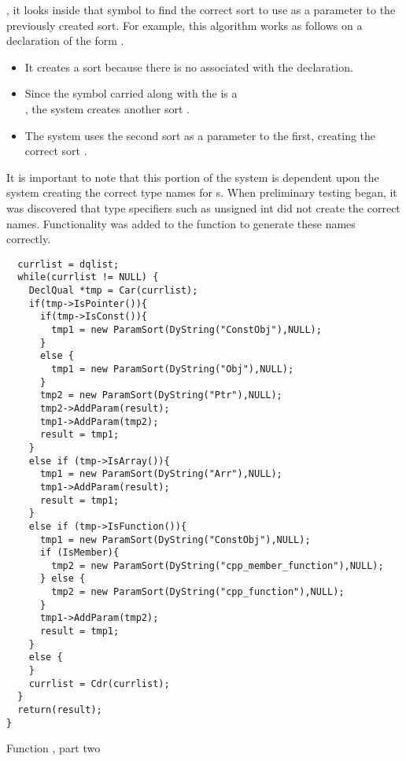 , it looks inside that symbol to find the correct
sort to use as a parameter to the previously created sort. For
example, this algorithm works as follows on a declaration of the form
.
\begin{itemize}
\item It creates a sort  because there is no
 associated with the declaration.
\item Since the symbol carried along with the 
is a \\
, the system creates another sort
.
\item The system uses the second sort as a parameter to the first,
creating the correct sort .
\end{itemize}

It is important to note that this portion of the system is dependent
upon the system creating the correct type names for
 s. When preliminary testing began, it
was discovered that type specifiers such as {unsigned int} did not
create the correct names. Functionality was added to the function
 to generate these names correctly. 

\begin{BFIGURE}
\small
\begin{verbatim}
  currlist = dqlist;
  while(currlist != NULL) {
    DeclQual *tmp = Car(currlist);
    if(tmp->IsPointer()){
      if(tmp->IsConst()){
        tmp1 = new ParamSort(DyString("ConstObj"),NULL);
      }
      else {
        tmp1 = new ParamSort(DyString("Obj"),NULL);
      }
      tmp2 = new ParamSort(DyString("Ptr"),NULL);
      tmp2->AddParam(result);
      tmp1->AddParam(tmp2);
      result = tmp1;
    }
    else if (tmp->IsArray()){
      tmp1 = new ParamSort(DyString("Arr"),NULL);
      tmp1->AddParam(result);
      result = tmp1;
    }
    else if (tmp->IsFunction()){
      tmp1 = new ParamSort(DyString("ConstObj"),NULL);
      if (IsMember){
        tmp2 = new ParamSort(DyString("cpp_member_function"),NULL);
      } else {
        tmp2 = new ParamSort(DyString("cpp_function"),NULL);
      }
      tmp1->AddParam(tmp2);
      result = tmp1;
    }
    else {
    }
    currlist = Cdr(currlist);
  }
  return(result);
}
\end{verbatim}
\normalsize
\caption{Function , part two}
\label{buildsrttwo}
\end{BFIGURE}

